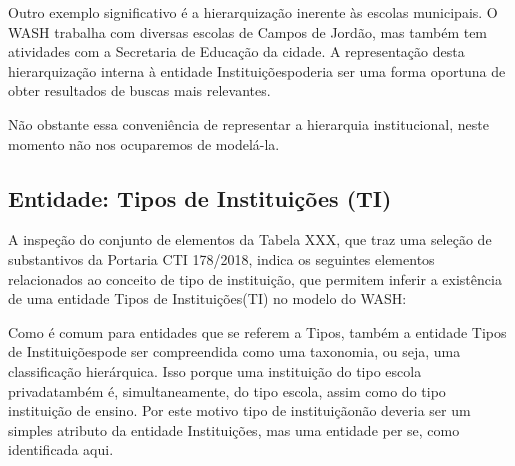 \documentclass[
12pt,		%
openright,	%
twoside,  %
a4paper,			%
chapter=TITLE,		%
english,			%
french,				%
spanish,			%
brazil				%
]{USPSC-classe/USPSC}
\begin{document}
Outro exemplo significativo \'e a hierarquiza\c{c}\~ao inerente \`as escolas municipais. O WASH trabalha com diversas escolas de Campos de Jord\~ao, mas tamb\'em tem atividades com a Secretaria de Educa\c{c}\~ao da cidade. A representa\c{c}\~ao desta hierarquiza\c{c}\~ao interna \`a entidade \textquotedbl Institui\c{c}\~oes\textquotedbl  poderia ser uma forma oportuna de obter resultados de buscas mais relevantes.




N\~ao obstante essa conveni\^encia de representar a hierarquia institucional, neste momento n\~ao nos ocuparemos de model\'a-la.




\subsection[Entidade: Tipos de Institui\c{c}\~oes (TI)]{Entidade: Tipos de Institui\c{c}\~oes (TI)}\label{Entidade: Tipos de Institui\c{c}\~oes (TI)}
A inspe\c{c}\~ao do conjunto de elementos da Tabela XXX, que traz uma sele\c{c}\~ao de substantivos da Portaria CTI 178/2018, indica os seguintes elementos relacionados ao conceito de \textquotedbl tipo de institui\c{c}\~ao\textquotedbl , que permitem inferir a exist\^encia de uma entidade \textquotedbl Tipos de Institui\c{c}\~oes\textquotedbl  (TI) no modelo do WASH:





\noindent\begin{center}\mbox{\centering{}}\end{center}


Como \'e comum para entidades que se referem a \textquotedbl Tipos\textquotedbl , tamb\'em a entidade \textquotedbl Tipos de Institui\c{c}\~oes\textquotedbl  pode ser compreendida como uma taxonomia, ou seja, uma classifica\c{c}\~ao hier\'arquica. Isso porque uma institui\c{c}\~ao do tipo \textquotedbl escola privada\textquotedbl  tamb\'em \'e, simultaneamente, do tipo \textquotedbl escola\textquotedbl , assim como do tipo \textquotedbl institui\c{c}\~ao de ensino\textquotedbl . Por este motivo \textquotedbl tipo de institui\c{c}\~ao\textquotedbl  n\~ao deveria ser um simples atributo da entidade \textquotedbl Institui\c{c}\~oes\textquotedbl , mas uma entidade per se, como identificada aqui.
\end{document}
